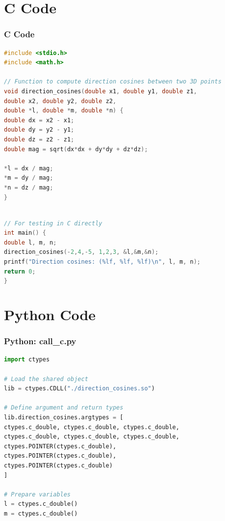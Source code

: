 \documentclass{beamer}
\theoremstyle{remark}
\numberwithin{equation}{section}
\begin{document}
\section{C Code}
\begin{frame}[fragile]
\frametitle{C Code }
\begin{lstlisting}[language=C]
#include <stdio.h>
#include <math.h>

// Function to compute direction cosines between two 3D points
void direction_cosines(double x1, double y1, double z1,
double x2, double y2, double z2,
double *l, double *m, double *n) {
double dx = x2 - x1;
double dy = y2 - y1;
double dz = z2 - z1;
double mag = sqrt(dx*dx + dy*dy + dz*dz);

*l = dx / mag;
*m = dy / mag;
*n = dz / mag;
}
\end{lstlisting}
\end{frame}
\begin{frame}[fragile]
 \begin{lstlisting}[language=C]
        
// For testing in C directly
int main() {
double l, m, n;
direction_cosines(-2,4,-5, 1,2,3, &l,&m,&n);
printf("Direction cosines: (%lf, %lf, %lf)\n", l, m, n);
return 0;
}
\end{lstlisting}
\end{frame}

\section{Python Code}
\begin{frame}[fragile]
\frametitle{Python: call\_c.py}
\begin{lstlisting}[language=Python]
import ctypes

# Load the shared object
lib = ctypes.CDLL("./direction_cosines.so")

# Define argument and return types
lib.direction_cosines.argtypes = [
ctypes.c_double, ctypes.c_double, ctypes.c_double,
ctypes.c_double, ctypes.c_double, ctypes.c_double,
ctypes.POINTER(ctypes.c_double),
ctypes.POINTER(ctypes.c_double),
ctypes.POINTER(ctypes.c_double)
]

# Prepare variables
l = ctypes.c_double()
m = ctypes.c_double()
\end{lstlisting}
\end{frame}
\end{document}
